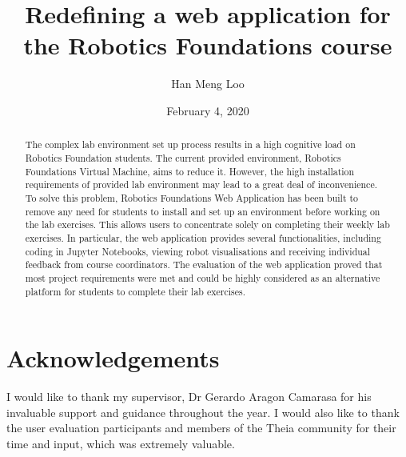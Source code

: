 \documentclass{l4proj}
\begin{document}
\title{Redefining a web application for the Robotics Foundations course}
\author{Han Meng Loo}
\date{February 4, 2020}

\maketitle

\begin{abstract}
    The complex lab environment set up process results in a high cognitive load on Robotics Foundation students. The current provided environment, Robotics Foundations Virtual Machine, aims to reduce it. However, the high installation requirements of provided lab environment may lead to a great deal of inconvenience. To solve this problem, Robotics Foundations Web Application has been built to remove any need for students to install and set up an environment before working on the lab exercises. This allows users to concentrate solely on completing their weekly lab exercises. In particular, the web application provides several functionalities, including coding in Jupyter Notebooks, viewing robot visualisations and receiving individual feedback from course coordinators. The evaluation of the web application proved that most project requirements were met and could be highly considered as an alternative platform for students to complete their lab exercises.
\end{abstract}

\chapter*{Acknowledgements}
%
%
I would like to thank my supervisor, Dr Gerardo Aragon Camarasa for his invaluable support and guidance throughout the year. I would also like to thank the user evaluation participants and members of the Theia community for their time and input, which was extremely valuable.
\end{document}
